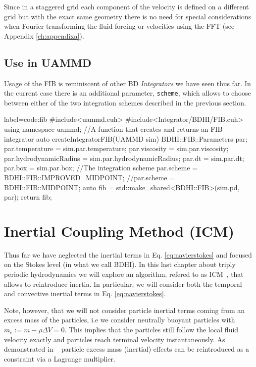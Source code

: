 \documentclass[ twoside,openright,titlepage,numbers=noenddot,%
headinclude,footinclude,cleardoublepage=empty,abstract=on,
BCOR=5mm,paper=b5,fontsize=11pt, dvipsnames
]{scrreprt}
\def\ucpp{uammd_cpp_lexer.py:UAMMDCppLexer -x}
\begin{document}
Since in a staggered grid each component of the velocity is defined on a different grid but with the exact same geometry there is no need for special considerations when Fourier transforming the fluid forcing or velocities using the \gls{FFT} (see Appendix \ref{ch:appendixa}).
\subsection*{Use in UAMMD}
Usage of the \gls{FIB} is reminiscent of other \gls{BD} \emph{Integrators} we have seen thus far. In the current case there is an additional parameter, \texttt{scheme}, which allows to choose between either of the two integration schemes described in the previous section.

\begin{code2}{label=code:fib}
#include<uammd.cuh>
#include<Integrator/BDHI/FIB.cuh>
using namespace uammd;
//A function that creates and returns an FIB integrator
auto createIntegratorFIB(UAMMD sim){   
  BDHI::FIB::Parameters par;
  par.temperature = sim.par.temperature;
  par.viscosity = sim.par.viscosity;
  par.hydrodynamicRadius = sim.par.hydrodynamicRadius;
  par.dt = sim.par.dt;  
  par.box = sim.par.box;
  //The integration scheme
  par.scheme = BDHI::FIB::IMPROVED_MIDPOINT;
  //par.scheme = BDHI::FIB::MIDPOINT;
  auto fib = std::make_shared<BDHI::FIB>(sim.pd, par);
  return fib;
}
\end{code2}





\section{Inertial Coupling Method (ICM)}\label{ch:icm}
Thus far we have neglected the inertial terms in Eq. \eqref{eq:navierstokes} and focused on the Stokes level (in what we call \gls{BDHI}). In this last chapter about triply periodic hydrodynamics we will explore an algorithm, refered to as \gls{ICM}~\cite{Balboa2014}, that allows to reintroduce inertia. In particular, we will consider both the temporal and convective inertial terms in Eq. \eqref{eq:navierstokes}.

Note, however, that we will not consider particle inertial terms coming from an excess mass of the particles, i.e we consider neutrally buoyant particles with $m_e := m - \rho\Delta V = 0$. This implies that the particles still follow the local fluid velocity exactly and particles reach terminal velocity instantaneously. As demonstrated in ~\cite{Balboa2014} particle excess mass (inertial) effects can be reintroduced as a constraint via a Lagrange multiplier.
\end{document}

